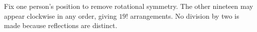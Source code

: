 Fix one person's position to remove rotational symmetry. The other nineteen may appear clockwise in any order, giving $\boxed{19!}$ arrangements. No division by two is made because reflections are distinct.
